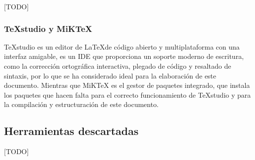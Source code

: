 [TODO]

\subsubsection*{TeXstudio y MiKTeX}
TeXstudio es un editor de \LaTeX\space de código abierto y multiplataforma con una interfaz amigable, es un IDE que proporciona un soporte moderno de escritura, como la corrección ortográfica interactiva, plegado de código y resaltado de sintaxis, por lo que se ha considerado ideal para la elaboración de este documento.
Mientras que MiKTeX es el gestor de paquetes integrado, que instala los paquetes que hacen falta para el correcto funcionamiento de TeXstudio y para la compilación y estructuración de este documento.

\subsection{Herramientas descartadas} 

[TODO]

